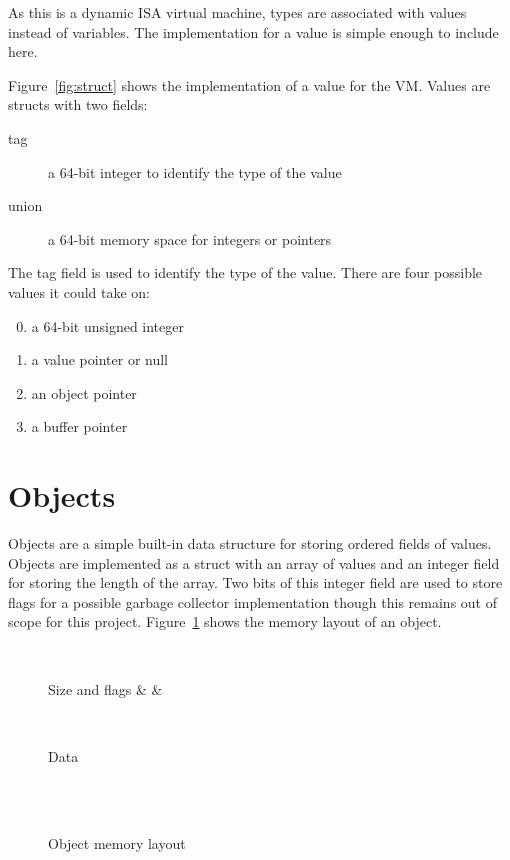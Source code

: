 \documentclass[english,a4paper]{report}
\begin{document}
As this is a dynamic ISA virtual machine, types are associated with
values instead of variables\cite{RobertoIerusalimschy}. The
implementation for a value is simple enough to include here.

Figure~\ref{fig:struct} shows the implementation of a value for the
VM. Values are structs with two fields:
\begin{description}
	\item[tag] a 64-bit integer to identify the type of the value
	\item[union] a 64-bit memory space for integers or pointers
\end{description}

The tag field is used to identify the type of the value. There are
four possible values it could take on:
\begin{enumerate}
	\setcounter{enumi}{-1}
	\item a 64-bit unsigned integer
	\item a value pointer or null
	\item an object pointer \setcounter{enumi}{3}
	\item a buffer pointer
\end{enumerate}

\section{Objects}

Objects are a simple built-in data structure for storing ordered
fields of values. Objects are implemented as a struct with an array of
values and an integer field for storing the length of the array. Two
bits of this integer field are used to store flags for a possible
garbage collector implementation though this remains out of scope for
this project. Figure~\ref{fig:objmem} shows the memory layout of an
object.

\begin{figure}
	\centering
	\begin{bytefield}[bitwidth=0.3em]{64}
		 \\
		\begin{rightwordgroup}{Size and flags}
			 & \bitbox{1}{} & 
		\end{rightwordgroup} \\
		
		\begin{rightwordgroup}{Data}
				\\
			 \\[1ex]
		\end{rightwordgroup} \\
	\end{bytefield}
	\caption{Object memory layout}
	\label{fig:objmem}
\end{figure}
\end{document}
